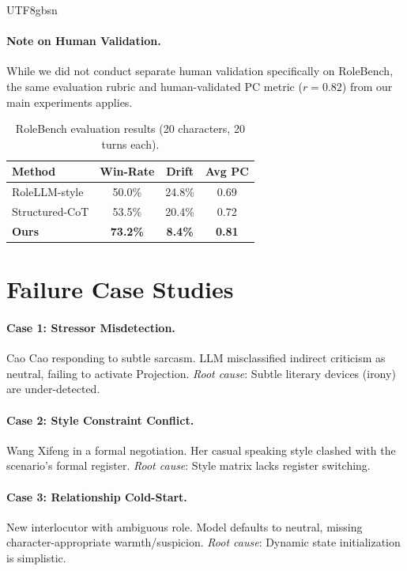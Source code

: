 \documentclass[11pt]{article}
\begin{document}
\begin{CJK*}{UTF8}{gbsn}
\paragraph{Note on Human Validation.} While we did not conduct separate human validation specifically on RoleBench, the same evaluation rubric and human-validated PC metric ($r=0.82$) from our main experiments applies.

\begin{table}[h]
\centering
\small
\begin{tabular}{lccc}
\toprule
\textbf{Method} & \textbf{Win-Rate} & \textbf{Drift} & \textbf{Avg PC} \\
\midrule
RoleLLM-style & 50.0\% & 24.8\% & 0.69 \\
Structured-CoT & 53.5\% & 20.4\% & 0.72 \\
\textbf{Ours} & \textbf{73.2\%} & \textbf{8.4\%} & \textbf{0.81} \\
\bottomrule
\end{tabular}
\caption{RoleBench evaluation results (20 characters, 20 turns each).}
\label{tab:rolebench}
\end{table}

\section{Failure Case Studies}
\label{sec:failure_cases}

\paragraph{Case 1: Stressor Misdetection.} Cao Cao responding to subtle sarcasm. LLM misclassified indirect criticism as neutral, failing to activate Projection. \textit{Root cause}: Subtle literary devices (irony) are under-detected.

\paragraph{Case 2: Style Constraint Conflict.} Wang Xifeng in a formal negotiation. Her casual speaking style clashed with the scenario's formal register. \textit{Root cause}: Style matrix lacks register switching.

\paragraph{Case 3: Relationship Cold-Start.} New interlocutor with ambiguous role. Model defaults to neutral, missing character-appropriate warmth/suspicion. \textit{Root cause}: Dynamic state initialization is simplistic.


\end{CJK*}
\end{document}
